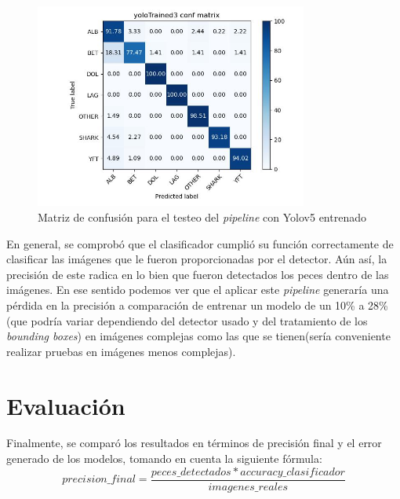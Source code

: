 \begin{figure}[h!]
\centering
\includegraphics[width=0.8\textwidth]{images/yoloTrained3_conf_matrix.jpg}
\caption{Matriz de confusión para el testeo del \textit{pipeline} con Yolov5 entrenado }
\label{fig:confusionMatrix3}
\end{figure}
En general, se comprobó que el clasificador cumplió su función correctamente de clasificar las imágenes que le fueron proporcionadas por el detector. Aún así, la precisión de este radica en lo bien que fueron detectados los peces dentro de las imágenes. En ese sentido podemos ver que el aplicar este \textit{pipeline} generaría una pérdida en la precisión a comparación de entrenar un modelo de un 10\% a 28\% (que podría variar dependiendo del detector usado y del tratamiento de los \textit{bounding boxes}) en imágenes complejas como las que se tienen(sería conveniente realizar pruebas en imágenes menos complejas).

\section{Evaluación}

Finalmente, se comparó los resultados en términos de precisión final y el error generado de los modelos, tomando en cuenta la siguiente fórmula:
\newline
$$ precision\_final = \frac{peces\_detectados * accuracy\_clasificador}{imagenes\_reales}$$

